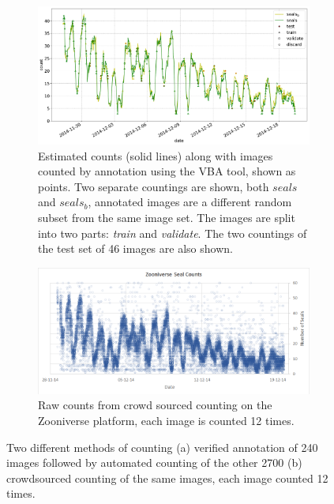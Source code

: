  \begin{figure}[pht!]
    \centering
    
    \begin{subfigure}[t]{1.0\linewidth}
    \includegraphics[width=1.0\linewidth]{charts/seals/seals_combined.pdf}
    \caption{Estimated counts (solid lines) along with images counted by annotation using the \gls{VBA} tool, shown as points. Two separate countings are shown, both $seals$ and $seals_b$, annotated images are a different random subset from the same image set. The images are split into two parts: \emph{train} and \emph{validate}. The two countings of the test set of 46 images are also shown. }
    \label{fig:turtle_rock}
    \end{subfigure}
    
    \begin{subfigure}[t]{1.0\linewidth}
    \includegraphics[width=1.0\linewidth]{figures/annotation/zooniverse.png}
    \caption{Raw counts from crowd sourced counting on the Zooniverse \cite{Zooniverse} platform, each image is counted 12 times. \cite{Eisert2017}}
    \label{fig:zooniverse_counts}
    \end{subfigure}
    
    \caption{Two different methods of counting (a) verified annotation of 240 images followed by automated counting of the other 2700 (b) crowdsourced counting of the same images, each image counted 12 times. }
    \label{fig:seals_timeseries}
\end{figure} 


